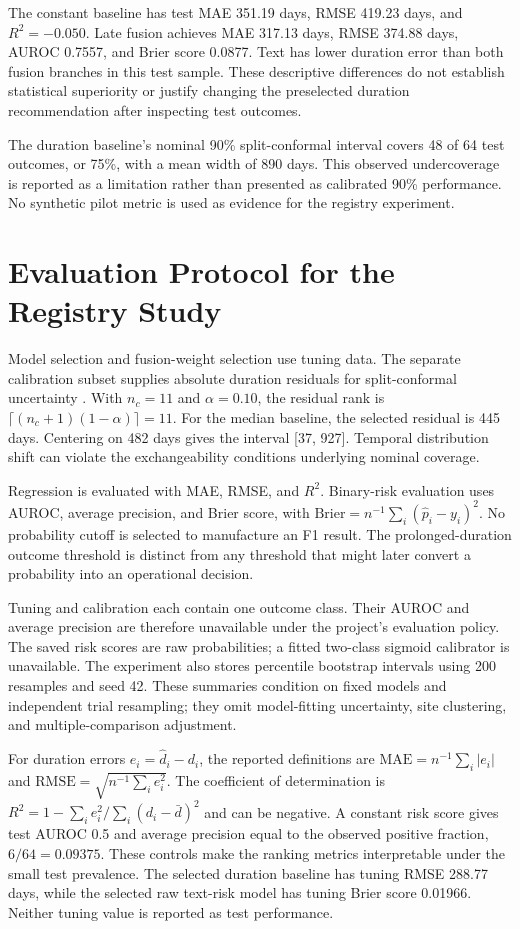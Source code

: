 \documentclass[10pt,letterpaper,twocolumn]{article}
\begin{document}
The constant baseline has test MAE 351.19 days, RMSE 419.23 days, and $R^2=-0.050$. Late fusion achieves MAE 317.13 days, RMSE 374.88 days, AUROC 0.7557, and Brier score 0.0877. Text has lower duration error than both fusion branches in this test sample. These descriptive differences do not establish statistical superiority or justify changing the preselected duration recommendation after inspecting test outcomes.

The duration baseline's nominal 90\% split-conformal interval covers 48 of 64 test outcomes, or 75\%, with a mean width of 890 days. This observed undercoverage is reported as a limitation rather than presented as calibrated 90\% performance. No synthetic pilot metric is used as evidence for the registry experiment.

\section{Evaluation Protocol for the Registry Study}

Model selection and fusion-weight selection use tuning data. The separate calibration subset supplies absolute duration residuals for split-conformal uncertainty \cite{conformal}. With $n_c=11$ and $\alpha=0.10$, the residual rank is $\lceil(n_c+1)(1-\alpha)\rceil=11$. For the median baseline, the selected residual is 445 days. Centering on 482 days gives the interval [37, 927]. Temporal distribution shift can violate the exchangeability conditions underlying nominal coverage.

Regression is evaluated with MAE, RMSE, and $R^2$. Binary-risk evaluation uses AUROC, average precision, and Brier score, with $\mathrm{Brier}=n^{-1}\sum_i(\hat p_i-y_i)^2$. No probability cutoff is selected to manufacture an F1 result. The prolonged-duration outcome threshold is distinct from any threshold that might later convert a probability into an operational decision.

Tuning and calibration each contain one outcome class. Their AUROC and average precision are therefore unavailable under the project's evaluation policy. The saved risk scores are raw probabilities; a fitted two-class sigmoid calibrator is unavailable. The experiment also stores percentile bootstrap intervals using 200 resamples and seed 42. These summaries condition on fixed models and independent trial resampling; they omit model-fitting uncertainty, site clustering, and multiple-comparison adjustment.

For duration errors $e_i=\hat d_i-d_i$, the reported definitions are $\mathrm{MAE}=n^{-1}\sum_i|e_i|$ and $\mathrm{RMSE}=\sqrt{n^{-1}\sum_i e_i^2}$. The coefficient of determination is $R^2=1-\sum_i e_i^2/\sum_i(d_i-\bar d)^2$ and can be negative. A constant risk score gives test AUROC 0.5 and average precision equal to the observed positive fraction, $6/64=0.09375$. These controls make the ranking metrics interpretable under the small test prevalence. The selected duration baseline has tuning RMSE 288.77 days, while the selected raw text-risk model has tuning Brier score 0.01966. Neither tuning value is reported as test performance.
\end{document}
